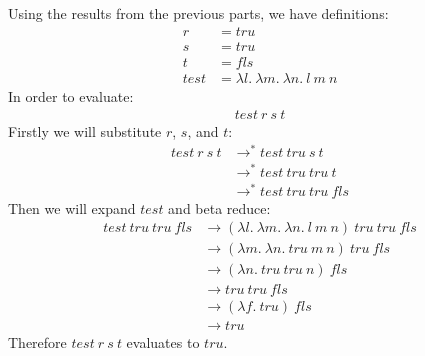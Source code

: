 \documentclass[letterpaper]{article}
\theoremstyle{plain}
\theoremstyle{definition}
\theoremstyle{remark}
\begin{document}
\subsection{}

Using the results from the previous parts, we have definitions:
\begin{align*}
    r &= tru\\ 
    s &= tru\\
    t &= fls\\
    test &= \lambda{l}.~\lambda{m}.~\lambda{n}.~l~m~n
\end{align*}
In order to evaluate:
\begin{align*}
    test~r~s~t
\end{align*}
Firstly we will substitute $r$, $s$, and $t$:
\begin{align*}
    test~r~s~t &\to^* test~tru~s~t\\
    &\to^* test~tru~tru~t\\
    &\to^* test~tru~tru~fls
\end{align*}
Then we will expand $test$ and beta reduce:
\begin{align*}
    test~tru~tru~fls &\to (\lambda{l}.~\lambda{m}.~\lambda{n}.~l~m~n)~tru~tru~fls\\
    &\to (\lambda{m}.~\lambda{n}.~tru~m~n)~tru~fls\\
    &\to (\lambda{n}.~tru~tru~n)~fls\\
    &\to tru~tru~fls\\
    &\to (\lambda{f}.~tru)~fls\\
    &\to tru
\end{align*}
Therefore $test~r~s~t$ evaluates to $tru$.

\section{}
\end{document}
